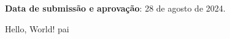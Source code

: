 \documentclass[
    article,			%
    11pt,				%
    oneside,			%
    a4paper,			%
    english,			%
    brazil,				%
    sumario=tradicional
]{abntex2}
\begin{document}

\frenchspacing{}

\pretextual{}

\maketitle{}



\begin{center}\smaller{}
    \textbf{Data de submissão e aprovação}: 28 de agosto de 2024.
\end{center}


\textual{}

Hello, World! \gls{pai}


\postextual{}



\printglossaries{}

\end{document}
